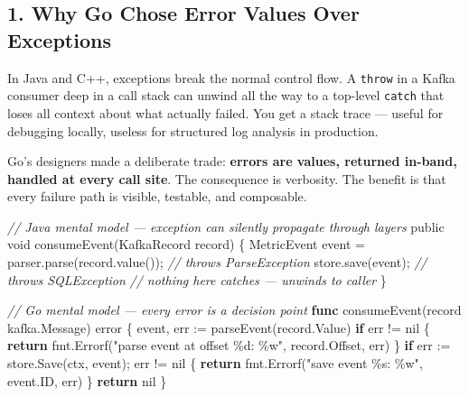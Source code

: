 \documentclass[
]{article}
\newenvironment{Shaded}{}{}
\newcommand{\CommentTok}[1]{\textcolor[rgb]{0.38,0.63,0.69}{\textit{#1}}}
\newcommand{\ControlFlowTok}[1]{\textcolor[rgb]{0.00,0.44,0.13}{\textbf{#1}}}
\newcommand{\DataTypeTok}[1]{\textcolor[rgb]{0.56,0.13,0.00}{#1}}
\newcommand{\KeywordTok}[1]{\textcolor[rgb]{0.00,0.44,0.13}{\textbf{#1}}}
\newcommand{\NormalTok}[1]{#1}
\newcommand{\OperatorTok}[1]{\textcolor[rgb]{0.40,0.40,0.40}{#1}}
\newcommand{\OtherTok}[1]{\textcolor[rgb]{0.00,0.44,0.13}{#1}}
\newcommand{\StringTok}[1]{\textcolor[rgb]{0.25,0.44,0.63}{#1}}
\begin{document}
\hypertarget{why-go-chose-error-values-over-exceptions}{%
\subsection{1. Why Go Chose Error Values Over
Exceptions}\label{why-go-chose-error-values-over-exceptions}}

In Java and C++, exceptions break the normal control flow. A
\texttt{throw} in a Kafka consumer deep in a call stack can unwind all
the way to a top-level \texttt{catch} that loses all context about what
actually failed. You get a stack trace --- useful for debugging locally,
useless for structured log analysis in production.

Go's designers made a deliberate trade: \textbf{errors are values,
returned in-band, handled at every call site}. The consequence is
verbosity. The benefit is that every failure path is visible, testable,
and composable.

\begin{Shaded}
\begin{Highlighting}[]
\CommentTok{// Java mental model — exception can silently propagate through layers}
\NormalTok{public void consumeEvent}\OperatorTok{(}\NormalTok{KafkaRecord record}\OperatorTok{)} \OperatorTok{\{}
\NormalTok{    MetricEvent event }\OperatorTok{=}\NormalTok{ parser}\OperatorTok{.}\NormalTok{parse}\OperatorTok{(}\NormalTok{record}\OperatorTok{.}\NormalTok{value}\OperatorTok{());} \CommentTok{// throws ParseException}
\NormalTok{    store}\OperatorTok{.}\NormalTok{save}\OperatorTok{(}\NormalTok{event}\OperatorTok{);}                                 \CommentTok{// throws SQLException}
    \CommentTok{// nothing here catches — unwinds to caller}
\OperatorTok{\}}

\CommentTok{// Go mental model — every error is a decision point}
\KeywordTok{func}\NormalTok{ consumeEvent}\OperatorTok{(}\NormalTok{record kafka}\OperatorTok{.}\NormalTok{Message}\OperatorTok{)} \DataTypeTok{error} \OperatorTok{\{}
\NormalTok{    event}\OperatorTok{,}\NormalTok{ err }\OperatorTok{:=}\NormalTok{ parseEvent}\OperatorTok{(}\NormalTok{record}\OperatorTok{.}\NormalTok{Value}\OperatorTok{)}
    \ControlFlowTok{if}\NormalTok{ err }\OperatorTok{!=} \OtherTok{nil} \OperatorTok{\{}
        \ControlFlowTok{return}\NormalTok{ fmt}\OperatorTok{.}\NormalTok{Errorf}\OperatorTok{(}\StringTok{"parse event at offset \%d: \%w"}\OperatorTok{,}\NormalTok{ record}\OperatorTok{.}\NormalTok{Offset}\OperatorTok{,}\NormalTok{ err}\OperatorTok{)}
    \OperatorTok{\}}
    \ControlFlowTok{if}\NormalTok{ err }\OperatorTok{:=}\NormalTok{ store}\OperatorTok{.}\NormalTok{Save}\OperatorTok{(}\NormalTok{ctx}\OperatorTok{,}\NormalTok{ event}\OperatorTok{);}\NormalTok{ err }\OperatorTok{!=} \OtherTok{nil} \OperatorTok{\{}
        \ControlFlowTok{return}\NormalTok{ fmt}\OperatorTok{.}\NormalTok{Errorf}\OperatorTok{(}\StringTok{"save event \%s: \%w"}\OperatorTok{,}\NormalTok{ event}\OperatorTok{.}\NormalTok{ID}\OperatorTok{,}\NormalTok{ err}\OperatorTok{)}
    \OperatorTok{\}}
    \ControlFlowTok{return} \OtherTok{nil}
\OperatorTok{\}}
\end{Highlighting}
\end{Shaded}
\end{document}
